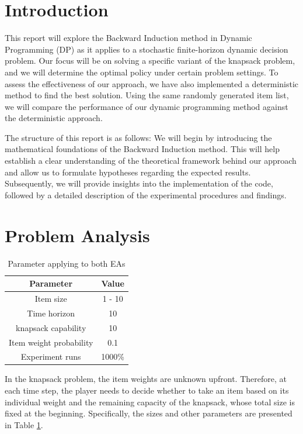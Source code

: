 
\section{Introduction}


This report will explore the Backward Induction method in Dynamic Programming (DP) as it applies to a stochastic finite-horizon dynamic decision problem. Our focus will be on solving a specific variant of the knapsack problem, and we will determine the optimal policy under certain problem settings. To assess the effectiveness of our approach, we have also implemented a deterministic method to find the best solution. Using the same randomly generated item list, we will compare the performance of our dynamic programming method against the deterministic approach.

The structure of this report is as follows: We will begin by introducing the mathematical foundations of the Backward Induction method. This will help establish a clear understanding of the theoretical framework behind our approach and allow us to formulate hypotheses regarding the expected results. Subsequently, we will provide insights into the implementation of the code, followed by a detailed description of the experimental procedures and findings.

\section{Problem Analysis}
\begin{table}
    \centering
    \caption{Parameter applying to both EAs}
    \label{tab:my_label}
    \begin{tabular}{@{}cc@{}}
     \hline %
        Parameter & Value \\ \hline
        Item size & 1 - 10 \\
        Time horizon & 10 \\
        knapsack capability & 10 \\
        Item weight probability & 0.1 \\
        Experiment runs & 1000\% \\\hline
    \end{tabular}
\end{table}
In the knapsack problem, the item weights are unknown upfront. Therefore, at each time step, the player needs to decide whether to take an item based on its individual weight and the remaining capacity of the knapsack, whose total size is fixed at the beginning. Specifically, the sizes and other parameters are presented in Table \ref{tab:my_label}.

